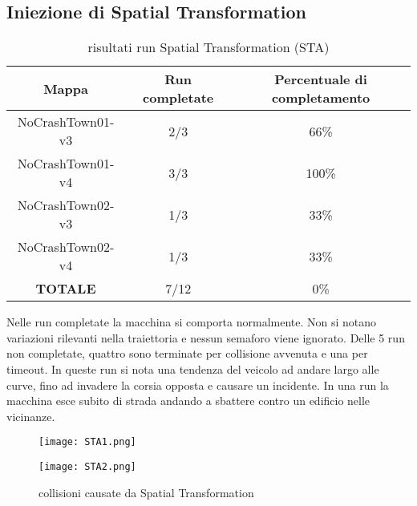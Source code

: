 \subsection{Iniezione di Spatial Transformation}
\begin{table}[h]
    \begin{tabular}{|c|c|c|}
        \hline
        Mappa                   & Run completate & Percentuale di completamento\\
        \hline
        NoCrashTown01-v3        & 2/3            & 66\% \\
        NoCrashTown01-v4        & 3/3            & 100\% \\
        NoCrashTown02-v3        & 1/3            & 33\% \\
        NoCrashTown02-v4        & 1/3            & 33\%  \\
        \hline
        \textbf{TOTALE}                  & 7/12           & 0\% \\
        \hline
    \end{tabular}
    \caption{risultati run Spatial Transformation (STA)}
    \label{tab:sta}
\end{table}
Nelle run completate la macchina si comporta normalmente. Non si notano variazioni rilevanti nella traiettoria e nessun semaforo viene ignorato. Delle 5 run
non completate, quattro sono terminate per collisione avvenuta e una per timeout. In queste run si nota una tendenza del veicolo ad andare largo alle curve, fino ad invadere la corsia opposta e causare un incidente.
In una run la macchina esce subito di strada andando a sbattere contro un edificio nelle vicinanze.
\begin{figure}[h]
    \centering
    \parbox{6cm}{
    \texttt{[image: STA1.png]}
    \label{fig:sta1}}
    \qquad
    \begin{minipage}{6cm}
    \texttt{[image: STA2.png]}
    \label{fig:sta2}
    \end{minipage}
    \caption{collisioni causate da Spatial Transformation}
    \label{fig:starun}
    \end{figure}

